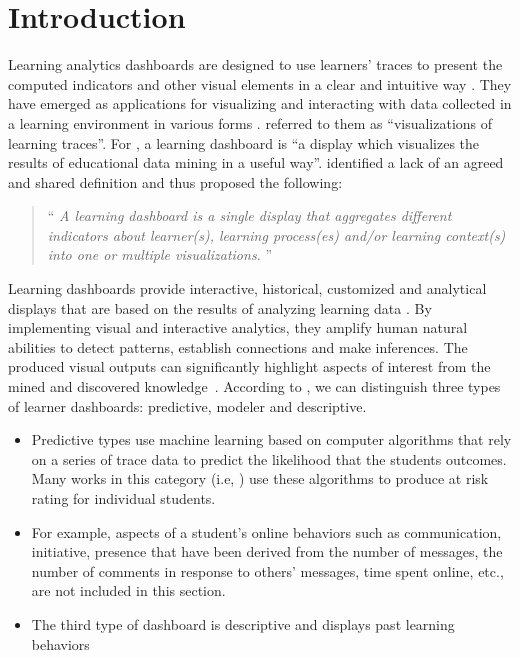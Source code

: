 \documentclass[manuscript,nonacm,12pt]{acmart}
\begin{document}
\section{Introduction} 
Learning analytics dashboards are designed to use learners' traces to present the computed indicators and other visual elements in a clear and intuitive way \citep{Brouns2015}.
They have emerged as applications for visualizing and interacting with data collected in a learning environment in various forms \citep{Ramos2015}. \citet{Steiner2014} referred to them as ``visualizations of learning traces''. For \citet{Yoo2015}, a learning dashboard is ``a display which visualizes the results of educational data mining in a useful way''. 
\citet{Schwendimann2017} identified a lack of an agreed and shared definition and thus proposed the following:
\begin{quotation}
	``\textit{%
		A learning dashboard is a single display that aggregates different indicators
		about learner(s), learning process(es) and/or learning context(s) into one or
		multiple visualizations.
	}'' \citep{Schwendimann2017}
\end{quotation}
Learning dashboards provide interactive, historical, customized and analytical displays that are based on the results of  analyzing learning data \citep{Park2015, Kim2015}. By implementing visual and interactive analytics, they amplify human natural abilities to detect patterns, establish connections and make inferences. The produced visual outputs can significantly highlight aspects of interest from the mined and discovered knowledge~\citep{Duval2011}. According to \citet{bennett2019four}, we can distinguish  three types of learner dashboards: predictive, modeler and descriptive. 
\begin{itemize}
    \item Predictive types use machine learning based on computer algorithms that rely on a series of trace data to predict the likelihood that the students outcomes. Many works in this category (i.e, \citep{arnold2014exercise}) use these algorithms to produce at risk rating for individual students.
    \item For example, aspects of a student's online behaviors such as communication, initiative, presence that have been derived from the number of messages, the number of comments in response to others' messages, time spent online, etc., are not included in this section. 
    \item The third type of dashboard is descriptive and displays past learning behaviors
\end{itemize}
\end{document}
